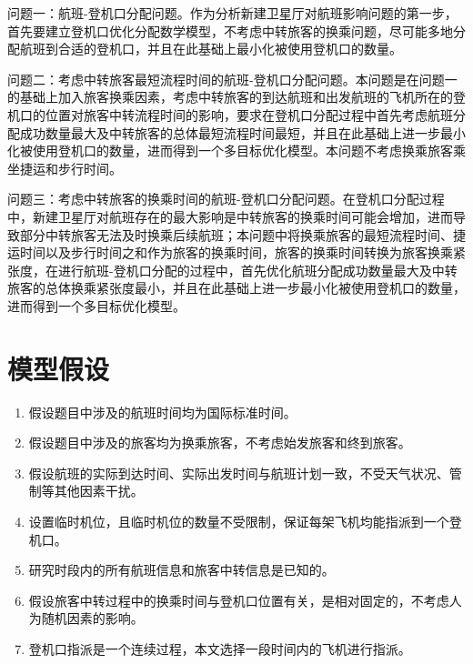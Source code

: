 \documentclass[bwprint]{gmcmthesis}
\numberwithin{figure}{section}
\begin{document}
问题一：航班-登机口分配问题。作为分析新建卫星厅对航班影响问题的第一步，首先要建立登机口优化分配数学模型，不考虑中转旅客的换乘问题，尽可能多地分配航班到合适的登机口，并且在此基础上最小化被使用登机口的数量。

问题二：考虑中转旅客最短流程时间的航班-登机口分配问题。本问题是在问题一的基础上加入旅客换乘因素，考虑中转旅客的到达航班和出发航班的飞机所在的登机口的位置对旅客中转流程时间的影响，要求在登机口分配过程中首先考虑航班分配成功数量最大及中转旅客的总体最短流程时间最短，并且在此基础上进一步最小化被使用登机口的数量，进而得到一个多目标优化模型。本问题不考虑换乘旅客乘坐捷运和步行时间。

问题三：考虑中转旅客的换乘时间的航班-登机口分配问题。在登机口分配过程中，新建卫星厅对航班存在的最大影响是中转旅客的换乘时间可能会增加，进而导致部分中转旅客无法及时换乘后续航班；本问题中将换乘旅客的最短流程时间、捷运时间以及步行时间之和作为旅客的换乘时间，旅客的换乘时间转换为旅客换乘紧张度，在进行航班-登机口分配的过程中，首先优化航班分配成功数量最大及中转旅客的总体换乘紧张度最小，并且在此基础上进一步最小化被使用登机口的数量，进而得到一个多目标优化模型。

\section{模型假设}
\begin{enumerate}[label={(\arabic*)}]
\item 假设题目中涉及的航班时间均为国际标准时间。
\item 假设题目中涉及的旅客均为换乘旅客，不考虑始发旅客和终到旅客。
\item 假设航班的实际到达时间、实际出发时间与航班计划一致，不受天气状况、管制等其他因素干扰。
\item 设置临时机位，且临时机位的数量不受限制，保证每架飞机均能指派到一个登机口。
\item 研究时段内的所有航班信息和旅客中转信息是已知的。
\item 假设旅客中转过程中的换乘时间与登机口位置有关，是相对固定的，不考虑人为随机因素的影响。
\item 登机口指派是一个连续过程，本文选择一段时间内的飞机进行指派。
\end{enumerate}


\end{document}
